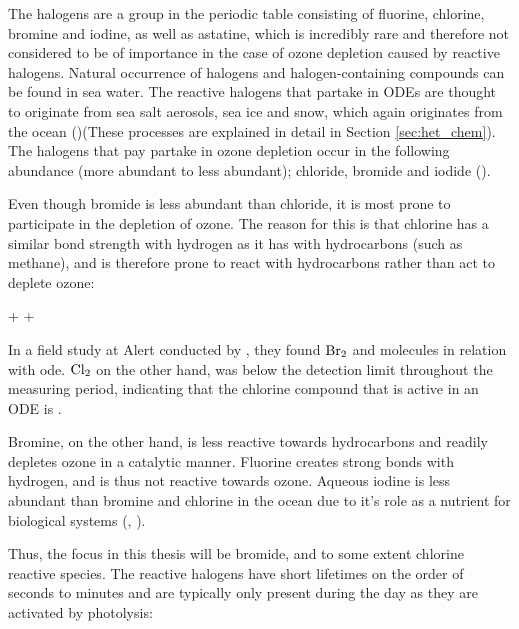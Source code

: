 The halogens are a group in the periodic table consisting of fluorine, chlorine, bromine and iodine, as well as astatine, which is incredibly rare and therefore not considered to be of importance in the case of ozone depletion caused by reactive halogens. Natural occurrence of halogens and halogen-containing compounds can be found in sea water. The reactive halogens that partake in ODEs  are thought to originate from sea salt aerosols, sea ice and snow, which again originates from the ocean (\cite{Foster2001})(These processes are explained in detail in Section \ref{sec:het_chem}). The halogens that pay partake in ozone depletion occur in the following abundance (more abundant to less abundant); chloride, bromide and iodide (\cite{Simpson2015}). 

\medskip

Even though bromide is less abundant than chloride, it is most prone to participate in the depletion of ozone. The reason for this is that chlorine has a similar bond strength with hydrogen as it has with hydrocarbons (such as methane), and is therefore prone to react with hydrocarbons rather than act to deplete ozone: 

\begin{reaction}
     +  \rightarrow {} + 
    \label{R:cl_ch4}
\end{reaction}

In a field study at Alert conducted by \cite{Foster2001}, they found $\mathrm{Br_2}$ and  molecules in relation with \acrshort{ode}. $\mathrm{Cl_2}$ on the other hand, was below the detection limit throughout the measuring period, indicating that the chlorine compound that is active in an ODE is .

\medskip

Bromine, on the other hand, is less reactive towards hydrocarbons and readily depletes ozone in a catalytic manner.  Fluorine creates strong bonds with hydrogen, and is thus not reactive towards ozone. Aqueous iodine is less abundant than bromine and chlorine in the ocean due to it's role as a nutrient for biological systems (\cite{FinlaysonPitts2010}, \cite{Simpson2015}). 

\medskip

Thus, the focus in this thesis will be bromide, and to some extent chlorine reactive species. The reactive halogens have short lifetimes on the order of seconds to minutes and are typically only present during the day as they are activated by photolysis:



